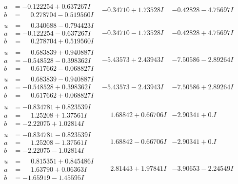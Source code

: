\documentclass[1p]{elsarticle_modified}
\theoremstyle{definition}
\begin{document}
$$\begin{array}{c|c|c}
\begin{aligned}
a &= -0.122254 + 0.637267 I \\
b &= \phantom{-}0.278704 - 0.519560 I\end{aligned}
 & -0.34710 + 1.73528 I & -0.42828 - 4.75697 I \\ \hline\begin{aligned}
u &= \phantom{-}0.340688 - 0.794423 I \\
a &= -0.122254 - 0.637267 I \\
b &= \phantom{-}0.278704 + 0.519560 I\end{aligned}
 & -0.34710 - 1.73528 I & -0.42828 + 4.75697 I \\ \hline\begin{aligned}
u &= \phantom{-}0.683839 + 0.940887 I \\
a &= -0.548528 - 0.398362 I \\
b &= \phantom{-}0.617662 - 0.068827 I\end{aligned}
 & -5.43573 + 2.43943 I & -7.50586 - 2.89264 I \\ \hline\begin{aligned}
u &= \phantom{-}0.683839 - 0.940887 I \\
a &= -0.548528 + 0.398362 I \\
b &= \phantom{-}0.617662 + 0.068827 I\end{aligned}
 & -5.43573 - 2.43943 I & -7.50586 + 2.89264 I \\ \hline\begin{aligned}
u &= -0.834781 + 0.823539 I \\
a &= \phantom{-}1.25208 + 1.37561 I \\
b &= -2.22075 + 1.02814 I\end{aligned}
 & \phantom{-}1.68842 + 0.66706 I & -2.90341 + 0. I\phantom{ +0.000000I} \\ \hline\begin{aligned}
u &= -0.834781 - 0.823539 I \\
a &= \phantom{-}1.25208 - 1.37561 I \\
b &= -2.22075 - 1.02814 I\end{aligned}
 & \phantom{-}1.68842 - 0.66706 I & -2.90341 + 0. I\phantom{ +0.000000I} \\ \hline\begin{aligned}
u &= \phantom{-}0.815351 + 0.845486 I \\
a &= \phantom{-}1.63790 + 0.06363 I \\
b &= -1.65919 - 1.45595 I\end{aligned}
 & \phantom{-}2.81443 + 1.97841 I & -3.90653 - 2.24549 I \\ \hline\begin{aligned}

\end{aligned}
\end{array}$$
\end{document}
